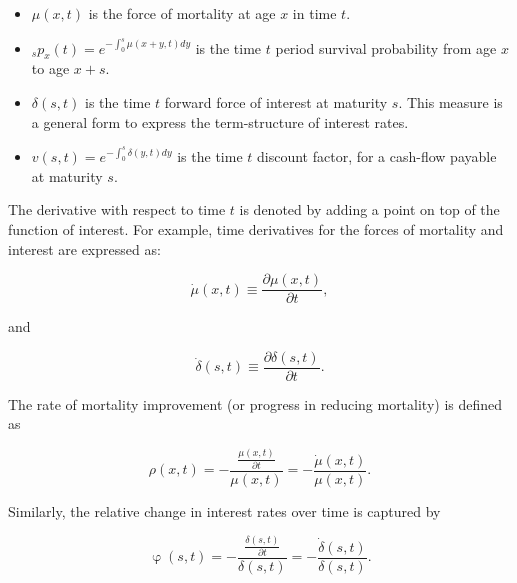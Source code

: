 \documentclass[12pt]{article}
\begin{document}
\begin{itemize}

\item
\(\mu(x,t)\) is the force of mortality at age \(x\) in time $t$.

\item
$_sp_x(t)=e^{-\int_{0}^{s}\mu(x+y,t)dy}$ is the time $t$ period survival probability from age \(x\) to age \(x+s\). 


\item
\(\delta(s,t)\) is the time $t$ forward force of interest at maturity $s$. This measure is a general form to express the term-structure of interest rates.

\item 

${v}(s,t)=e^{-\int_{0}^{s}\delta(y,t)dy}$ is the time $t$ discount factor, for a cash-flow payable at maturity $s$.

\end{itemize}

The derivative with respect to time $t$ is denoted by adding a point on top of the function of interest. For example, time derivatives for the forces of mortality and interest are expressed as:

\begin{equation} \label{eq:mudot}
\dot{\mu}(x,t)\equiv\frac{\partial\mu(x,t)}{\partial t},
\end{equation}

and 

\begin{equation} \label{eq:mudot}
\dot{\delta}(s,t)\equiv\frac{\partial\delta(s,t)}{\partial t}.
\end{equation}



The rate of mortality improvement (or progress in reducing mortality) is defined as


\begin{equation} \label{eq:rho}
\rho(x,t)=-\frac{\frac{\mu(x,t)}{\partial t}}{\mu(x,t)} = - \frac{\dot{\mu}(x,t)}{\mu(x,t)}.
\end{equation}

Similarly, the relative change in interest rates over time is captured by 


\begin{equation} \label{eq:phi}
\upvarphi(s,t)=-\frac{\frac{\delta(s,t)}{\partial t}}{\delta(s,t)} = -\frac{\dot{\delta}(s,t)}{\delta(s,t)}.
\end{equation}
\end{document}
